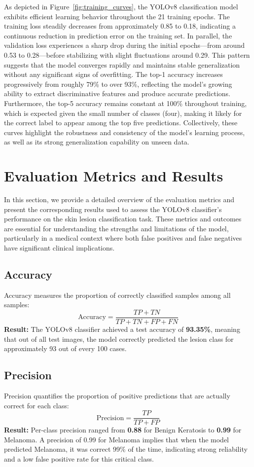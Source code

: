 \documentclass[a4paper,12pt]{report}
\begin{document}
\begin{spacing}{1.5}
    As depicted in Figure~\ref{fig:training_curves}, the YOLOv8 classification model exhibits efficient learning behavior throughout the 21 training epochs. The training loss steadily decreases from approximately 0.85 to 0.18, indicating a continuous reduction in prediction error on the training set. In parallel, the validation loss experiences a sharp drop during the initial epochs—from around 0.53 to 0.28—before stabilizing with slight fluctuations around 0.29. This pattern suggests that the model converges rapidly and maintains stable generalization without any significant signs of overfitting. The top-1 accuracy increases progressively from roughly 79\% to over 93\%, reflecting the model’s growing ability to extract discriminative features and produce accurate predictions. Furthermore, the top-5 accuracy remains constant at 100\% throughout training, which is expected given the small number of classes (four), making it likely for the correct label to appear among the top five predictions. Collectively, these curves highlight the robustness and consistency of the model’s learning process, as well as its strong generalization capability on unseen data.

    \section{Evaluation Metrics and Results}

    In this section, we provide a detailed overview of the evaluation metrics and present the corresponding results used to assess the YOLOv8 classifier's performance on the skin lesion classification task. These metrics and outcomes are essential for understanding the strengths and limitations of the model, particularly in a medical context where both false positives and false negatives have significant clinical implications.
    
    
    \subsection{Accuracy}
    Accuracy measures the proportion of correctly classified samples among all samples:
    \[
        \text{Accuracy} = \frac{TP + TN}{TP + TN + FP + FN}
    \]
    \textbf{Result:} The YOLOv8 classifier achieved a test accuracy of \textbf{93.35\%}, meaning that out of all test images, the model correctly predicted the lesion class for approximately 93 out of every 100 cases.
    
    \subsection{Precision}
    Precision quantifies the proportion of positive predictions that are actually correct for each class:
    \[
        \text{Precision} = \frac{TP}{TP + FP}
    \]
    \textbf{Result:} Per-class precision ranged from \textbf{0.88} for Benign Keratosis to \textbf{0.99} for Melanoma.  
    A precision of 0.99 for Melanoma implies that when the model predicted Melanoma, it was correct 99\% of the time, indicating strong reliability and a low false positive rate for this critical class.
    

\end{spacing}
\end{document}
